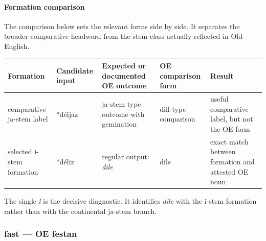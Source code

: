 \documentclass[
  british,
  a4paper,
]{article}
\newcounter{none} %
\begin{document}
\paragraph{Formation comparison}\label{formation-comparison-1}

The comparison below sets the relevant forms side by side. It separates
the broader comparative headword from the stem class actually reflected
in Old English.

{\def\LTcaptype{none} %
\begin{longtable}[]{@{}
  >{\raggedright\arraybackslash}p{}
  >{\raggedright\arraybackslash}p{}
  >{\raggedright\arraybackslash}p{}
  >{\raggedright\arraybackslash}p{}
  >{\raggedright\arraybackslash}p{}@{}}
\toprule\noalign{}
\begin{minipage}[b]{\linewidth}\raggedright
Formation
\end{minipage} & \begin{minipage}[b]{\linewidth}\raggedright
Candidate input
\end{minipage} & \begin{minipage}[b]{\linewidth}\raggedright
Expected or documented OE outcome
\end{minipage} & \begin{minipage}[b]{\linewidth}\raggedright
OE comparison form
\end{minipage} & \begin{minipage}[b]{\linewidth}\raggedright
Result
\end{minipage} \\
\midrule\noalign{}
\endhead
\bottomrule\noalign{}
\endlastfoot
comparative ja-stem label & *déljaz & ja-stem type outcome with
gemination & dill-type comparison & useful comparative label, but not
the OE form \\
selected i-stem formation & *déliz & regular output: \emph{dile} & dile
& exact match between formation and attested OE noun \\
\end{longtable}
}

The single \emph{l} is the decisive diagnostic. It identifies
\emph{dile} with the i-stem formation rather than with the continental
ja-stem branch.

\subsubsection{fast --- OE festan}\label{fast-oe-festan}
\end{document}
